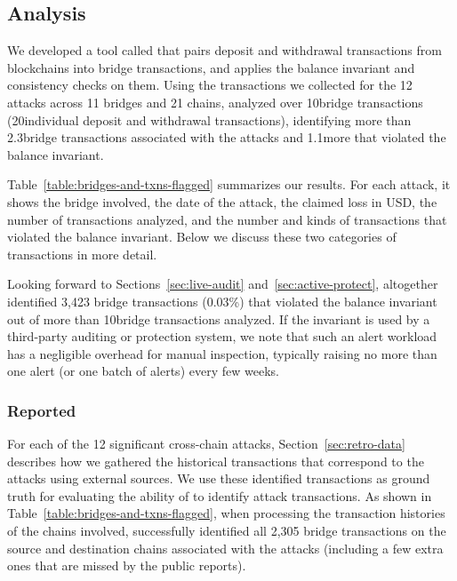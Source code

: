 \subsection{Analysis}

\label{sec:retro-analysis}


We developed a tool called \offlinetool that pairs deposit and
withdrawal transactions from blockchains into bridge transactions, and
applies the balance invariant and consistency checks on them.  Using
the transactions we collected for the 12 attacks across 11 bridges and
21 chains, \offlinetool analyzed over 10\mil bridge transactions (20\mil individual deposit and withdrawal transactions),
identifying more than 2.3\thou bridge transactions associated with the
attacks and 1.1\thou more that violated the balance invariant.


Table~\ref{table:bridges-and-txns-flagged} summarizes our results.
For each attack, it shows the bridge involved, the date of the attack,
the claimed loss in USD, the number of transactions \offlinetool
analyzed, and the number and kinds of transactions that violated the
balance invariant.
%
Below we discuss these two categories of transactions in more detail.

Looking forward to Sections~\ref{sec:live-audit}
and~\ref{sec:active-protect}, altogether \offlinetool identified 3,423
bridge transactions (0.03\%) that violated the balance invariant out
of more than 10\mil bridge transactions analyzed.  If the invariant is used by a
third-party auditing or protection system, we note that such an alert
workload has a negligible overhead for manual inspection, typically
raising no more than one alert (or one batch of alerts) every few
weeks.

\subsubsection{Reported}

For each of the 12 significant cross-chain attacks,
Section~\ref{sec:retro-data} describes how we gathered the historical
transactions that correspond to the attacks using external sources.
We use these identified transactions as ground truth for evaluating
the ability of \offlinetool to identify attack transactions.  As shown
in Table~\ref{table:bridges-and-txns-flagged}, when processing the
transaction histories of the chains involved, \offlinetool
successfully identified all 2,305 bridge transactions on the source
and destination chains associated with the attacks (including a few extra ones that are missed by the public reports).

